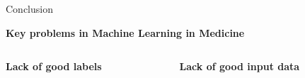 \documentclass[8pt,xcolor=table,aspectratio=169]{beamer}
\begin{document}
\begin{frame}{Conclusion}


\vspace{-2em}
\begin{center}
\large{\textbf{Key problems in Machine Learning in Medicine}} 
\end{center}


\begin{columns}[t]
\begin{column}{0.5\textwidth}
\centering

\textbf{\large Lack of good labels}

% 
%  
% 

\vspace{1em}


\end{column}
\begin{column}{0.5\textwidth}
\centering

\textbf{\large Lack of good input data}


% 
% 
% 


\end{column}
\end{columns}
\end{frame}
\end{document}
